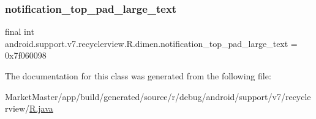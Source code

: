 \mbox{\label{classandroid_1_1support_1_1v7_1_1recyclerview_1_1R_1_1dimen_a10e60729bcb5e62df2e95ff21a1f777e}} 
\subsubsection{\texorpdfstring{notification\+\_\+top\+\_\+pad\+\_\+large\+\_\+text}{notification\_top\_pad\_large\_text}}
{\footnotesize\ttfamily final int android.\+support.\+v7.\+recyclerview.\+R.\+dimen.\+notification\+\_\+top\+\_\+pad\+\_\+large\+\_\+text = 0x7f060098\hspace{0.3cm}{\ttfamily [static]}}



The documentation for this class was generated from the following file\+:\begin{DoxyCompactItemize}
\item 
Market\+Master/app/build/generated/source/r/debug/android/support/v7/recyclerview/\mbox{\hyperlink{debug_2android_2support_2v7_2recyclerview_2R_8java}{R.\+java}}\end{DoxyCompactItemize}
